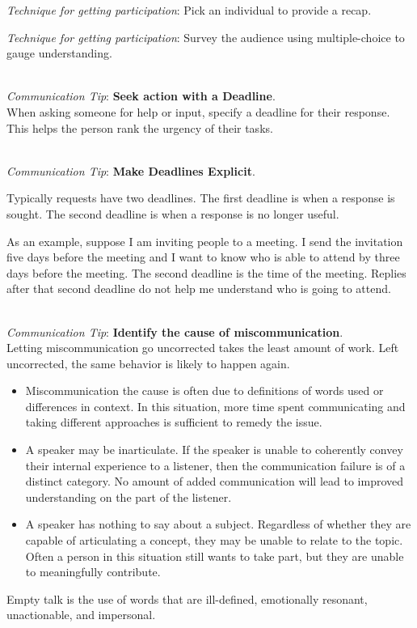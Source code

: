 \textit{Technique for getting participation}: Pick an individual to provide a recap.

\textit{Technique for getting participation}: Survey the audience using multiple-choice to gauge understanding.

\ \\
\textit{Communication Tip}: \textbf{Seek action with a Deadline}.\\
When asking someone for help or input, specify a deadline for their response. 
This helps the person rank the urgency of their tasks.

\ \\
\textit{Communication Tip}: \textbf{Make Deadlines Explicit}.

Typically requests have two deadlines. The first deadline is when a response is sought. The second deadline is when a response is no longer useful.  

As an example, suppose I am inviting people to a meeting. I send the invitation five days before the meeting and I want to know who is able to attend by three days before the meeting. The second deadline is the time of the meeting. Replies after that second deadline do not help me understand who is going to attend. 

\ \\
\textit{Communication Tip}: \textbf{Identify the cause of miscommunication}.\\
Letting miscommunication go uncorrected takes the least amount of work. Left uncorrected, the same behavior is likely to happen again. 

\begin{itemize}
    \item Miscommunication the cause is often due to definitions of words used or differences in context. In this situation, more time spent communicating and taking different approaches is sufficient to remedy the issue.
\item A speaker may be inarticulate. If the speaker is unable to coherently convey their internal experience to a listener, then the communication failure is of a distinct category. No amount of added communication will lead to improved understanding on the part of the listener.
\item A speaker has nothing to say about a subject. Regardless of whether they are capable of articulating a concept, they may be unable to relate to the topic. Often a person in this situation still wants to take part, but they are unable to meaningfully contribute. 
\end{itemize}
Empty talk is the use of words that are ill-defined, emotionally resonant, unactionable, and impersonal.

